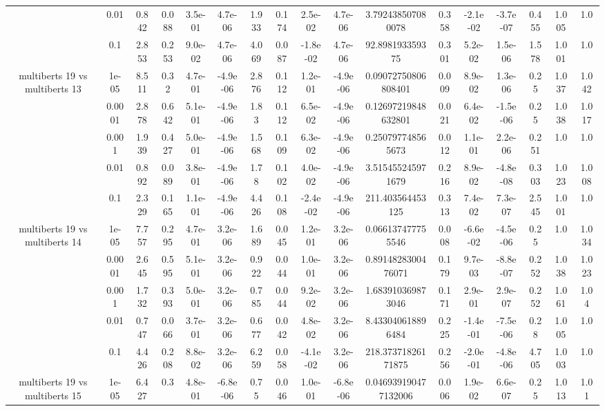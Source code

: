 \begin{tabular}{|c|c|c|c|c|c|c|c|c|c|c|c|c|c|c|c|c|}
 & 0.01 & 0.842 & 0.088 & 3.5e-01 & 4.7e-06 & 1.933 & 0.174 & 2.5e-02 & 4.7e-06 & 3.792438507080078 & 0.358 & -2.1e-02 & -3.7e-07 & 0.455 & 1.005 & 1.0 \\
 & 0.1 & 2.853 & 0.253 & 9.0e-02 & 4.7e-06 & 4.069 & 0.087 & -1.8e-02 & 4.7e-06 & 92.898193359375 & 0.301 & 5.2e-02 & 1.5e-06 & 1.578 & 1.001 & 1.0 \\
\hline
\multirow{5}{*}{multiberts 19 vs multiberts 13} & 1e-05 & 8.511 & 0.32 & 4.7e-01 & -4.9e-06 & 2.876 & 0.112 & 1.2e-01 & -4.9e-06 & 0.09072750806808401 & 0.009 & 8.9e-02 & 1.3e-06 & 0.25 & 1.037 & 1.042 \\
 & 0.0001 & 2.878 & 0.642 & 5.1e-01 & -4.9e-06 & 1.83 & 0.112 & 6.5e-02 & -4.9e-06 & 0.12697219848632801 & 0.021 & 6.4e-02 & -1.5e-06 & 0.25 & 1.038 & 1.017 \\
 & 0.001 & 1.939 & 0.427 & 5.0e-01 & -4.9e-06 & 1.568 & 0.109 & 6.3e-02 & -4.9e-06 & 0.250797748565673 & 0.012 & 1.1e-01 & 2.2e-06 & 0.251 & 1.0 & 1.0 \\
 & 0.01 & 0.892 & 0.089 & 3.8e-01 & -4.9e-06 & 1.78 & 0.102 & 4.0e-02 & -4.9e-06 & 3.515455245971679 & 0.216 & 8.9e-02 & -4.8e-08 & 0.303 & 1.023 & 1.008 \\
 & 0.1 & 2.329 & 0.165 & 1.1e-01 & -4.9e-06 & 4.426 & 0.108 & -2.4e-02 & -4.9e-06 & 211.403564453125 & 0.313 & 7.4e-02 & 7.3e-07 & 2.545 & 1.001 & 1.0 \\
\hline
\multirow{5}{*}{multiberts 19 vs multiberts 14} & 1e-05 & 7.757 & 0.295 & 4.7e-01 & 3.2e-06 & 1.689 & 0.045 & 1.2e-01 & 3.2e-06 & 0.066137477755546 & 0.008 & -6.6e-02 & -4.5e-06 & 0.25 & 1.0 & 1.034 \\
 & 0.0001 & 2.645 & 0.595 & 5.1e-01 & 3.2e-06 & 0.922 & 0.044 & 1.0e-01 & 3.2e-06 & 0.8914828300476071 & 0.179 & 9.7e-03 & -8.8e-07 & 0.252 & 1.038 & 1.023 \\
 & 0.001 & 1.732 & 0.393 & 5.0e-01 & 3.2e-06 & 0.785 & 0.044 & 9.2e-02 & 3.2e-06 & 1.683910369873046 & 0.171 & 2.9e-01 & 2.9e-07 & 0.252 & 1.061 & 1.04 \\
 & 0.01 & 0.747 & 0.066 & 3.7e-01 & 3.2e-06 & 0.677 & 0.042 & 4.8e-02 & 3.2e-06 & 8.433040618896484 & 0.225 & -1.4e-01 & -7.5e-06 & 0.28 & 1.005 & 1.0 \\
 & 0.1 & 4.426 & 0.208 & 8.8e-02 & 3.2e-06 & 6.259 & 0.058 & -4.1e-02 & 3.2e-06 & 218.37371826171875 & 0.256 & -2.0e-01 & -4.8e-06 & 4.705 & 1.003 & 1.0 \\
\hline
\multirow{5}{*}{multiberts 19 vs multiberts 15} & 1e-05 & 6.427 & 0.3 & 4.8e-01 & -6.8e-06 & 0.75 & 0.046 & 1.0e-01 & -6.8e-06 & 0.046939190477132006 & 0.006 & 1.9e-02 & 6.6e-07 & 0.25 & 1.013 & 1.01 \\

\end{tabular}
